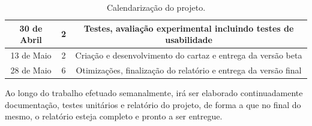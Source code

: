 \documentclass[10pt]{article}
\begin{document}
\begin{table}[!h]
\begin{tabular}{| c | c | c |}
        \hline
        30 de Abril     & 2                                                         & Testes, avaliação experimental incluindo testes de usabilidade  \\
        \hline
        13 de Maio      & 2                                                         & Criação e desenvolvimento do cartaz e entrega da versão beta    \\
        \hline
        28 de Maio      & 6                                                         & Otimizações, finalização do relatório e entrega da versão final \\
        \hline
    \end{tabular}
    \caption{Calendarização do projeto.}\label{calendar}
\end{table}

Ao longo do trabalho efetuado semanalmente, irá ser elaborado continuadamente documentação, testes unitários e relatório do projeto, de forma a que no final do mesmo, o relatório esteja completo e pronto a ser entregue.

\vspace{.75cm}



\end{document}
